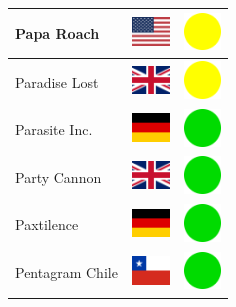 \documentclass[12pt, a4paper, twoside]{report}
\begin{document}
\begin{center}
\begin{longtable}{|p{5cm}|p{2cm}|p{2cm}|}
 Papa Roach                                                 & \includegraphics[width=1cm]{../img/flags/us} &   \includegraphics[width=1cm]{../likes/m} \\ \hline
 Paradise Lost                                              & \includegraphics[width=1cm]{../img/flags/gb} &   \includegraphics[width=1cm]{../likes/m} \\ \hline
 Parasite Inc.                                              & \includegraphics[width=1cm]{../img/flags/de} &   \includegraphics[width=1cm]{../likes/y} \\ \hline
 Party Cannon                                               & \includegraphics[width=1cm]{../img/flags/gb} &   \includegraphics[width=1cm]{../likes/y} \\ \hline
 Paxtilence                                                 & \includegraphics[width=1cm]{../img/flags/de} &   \includegraphics[width=1cm]{../likes/y} \\ \hline
 Pentagram Chile                                            & \includegraphics[width=1cm]{../img/flags/cl} &   \includegraphics[width=1cm]{../likes/y} \\ \hline

\end{longtable}
\end{center}
\end{document}
